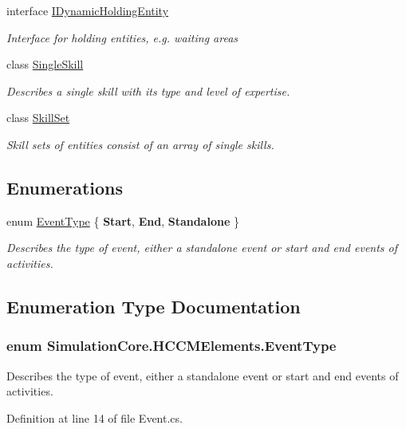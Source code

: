 \begin{DoxyCompactItemize}
interface \hyperlink{interface_simulation_core_1_1_h_c_c_m_elements_1_1_i_dynamic_holding_entity}{I\+Dynamic\+Holding\+Entity}
\begin{DoxyCompactList}\small\item\em Interface for holding entities, e.\+g. waiting areas \end{DoxyCompactList}\item 
class \hyperlink{class_simulation_core_1_1_h_c_c_m_elements_1_1_single_skill}{Single\+Skill}
\begin{DoxyCompactList}\small\item\em Describes a single skill with its type and level of expertise. \end{DoxyCompactList}\item 
class \hyperlink{class_simulation_core_1_1_h_c_c_m_elements_1_1_skill_set}{Skill\+Set}
\begin{DoxyCompactList}\small\item\em Skill sets of entities consist of an array of single skills. \end{DoxyCompactList}\end{DoxyCompactItemize}
\subsection*{Enumerations}
\begin{DoxyCompactItemize}
\item 
enum \hyperlink{namespace_simulation_core_1_1_h_c_c_m_elements_a669ec0bd71214ac647777c49eb962e13}{Event\+Type} \{ {\bfseries Start}, 
{\bfseries End}, 
{\bfseries Standalone}
 \}\begin{DoxyCompactList}\small\item\em Describes the type of event, either a standalone event or start and end events of activities. \end{DoxyCompactList}
\end{DoxyCompactItemize}


\subsection{Enumeration Type Documentation}
\subsubsection[{\texorpdfstring{Event\+Type}{EventType}}]{\setlength{\rightskip}{0pt plus 5cm}enum {\bf Simulation\+Core.\+H\+C\+C\+M\+Elements.\+Event\+Type}\hspace{0.3cm}{\ttfamily [strong]}}\hypertarget{namespace_simulation_core_1_1_h_c_c_m_elements_a669ec0bd71214ac647777c49eb962e13}{}\label{namespace_simulation_core_1_1_h_c_c_m_elements_a669ec0bd71214ac647777c49eb962e13}


Describes the type of event, either a standalone event or start and end events of activities. 



Definition at line 14 of file Event.\+cs.

